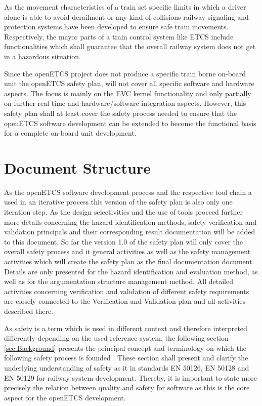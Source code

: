 \documentclass{template/openetcs_report}
\begin{document}
As the movement characteristics of a train set specific limits in which a driver alone is able to avoid derailment or any kind of collisions railway signaling and protection systems have been developed to ensure safe train movements. Respectively, the mayor parts of a train control system like ETCS include functionalities which shall guarantee that the overall railway system does not get in a hazardous situation.

Since the openETCS project does not produce a specific train borne on-board unit the openETCS safety plan, will not cover all specific software and hardware aspects. The focus is mainly on the EVC kernel functionality and only partially on further real time and hardware/software integration aspects. However, this safety plan shall at least cover the safety process needed to ensure that the openETCS software development can be extended to become the functional basis for a complete on-board unit development. 

\section{Document Structure}
\label{sec:document-structure}

As the openETCS software development process and the respective tool chain a used in an iterative process this version of the safety plan is also only one iteration step. As the design selectivities and the use of tools proceed further more details concerning the hazard identification methods, safety verification and validation principals and their corresponding result documentation will be added to this document. So far the version 1.0 of the safety plan will only cover the overall safety process and it general activities as well as the safety management activities which will create the safety plan as the final documentation document. Details are only presented for the hazard identification and evaluation method, as well as for the argumentation structure management method. All detailed activities concerning verification and validation of different safety requirements are closely connected to the Verification and Validation plan and all activities described there. 

As safety is a term which is used in different context and therefore interpreted differently depending on the used reference system, the following section \ref{sec:Background} presents the principal concept and terminology on which the following safety process is founded \cite{Schnieder.2013}. These section shall present and clarify the underlying understanding of safety as it in standards EN 50126, EN 50128 and EN 50129 for railway system development. Thereby, it is important to state more precisely the relation between quality and safety for software as this is the core aspect for the openETCS development.
\end{document}
